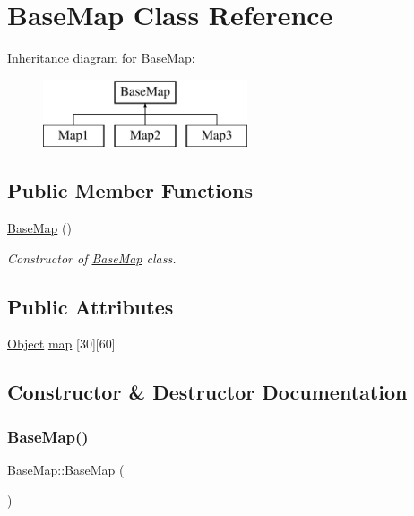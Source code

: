 \hypertarget{class_base_map}{}\section{Base\+Map Class Reference}
\label{class_base_map}
Inheritance diagram for Base\+Map\+:\begin{figure}[H]
\begin{center}
\leavevmode
\includegraphics[height=2.000000cm]{class_base_map}
\end{center}
\end{figure}
\subsection*{Public Member Functions}
\begin{DoxyCompactItemize}
\item 
\hyperlink{class_base_map_a00dd2d0f12517f43d8c046a4d8b681bf}{Base\+Map} ()
\begin{DoxyCompactList}\small\item\em Constructor of \hyperlink{class_base_map}{Base\+Map} class. \end{DoxyCompactList}\end{DoxyCompactItemize}
\subsection*{Public Attributes}
\begin{DoxyCompactItemize}
\item 
\hyperlink{class_object}{Object} \hyperlink{class_base_map_a1d9ea4ce08a8bbd32ac24ccead7a546d}{map} \mbox{[}30\mbox{]}\mbox{[}60\mbox{]}
\end{DoxyCompactItemize}


\subsection{Constructor \& Destructor Documentation}
\mbox{\label{class_base_map_a00dd2d0f12517f43d8c046a4d8b681bf}} 
\subsubsection{\texorpdfstring{Base\+Map()}{BaseMap()}}
{\footnotesize\ttfamily Base\+Map\+::\+Base\+Map (\begin{DoxyParamCaption}{ }\end{DoxyParamCaption})}



